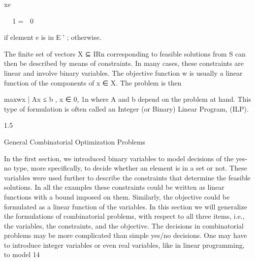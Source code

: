 \documentclass[titlepage]{book}
\begin{document}
xe


 1
=
 0

if element e is in E ′ ;
otherwise.

The finite set of vectors X ⊆ IRn corresponding to feasible solutions from S can then be described by
means of constraints. In many cases, these constraints are linear and involve binary variables. The
objective function w is usually a linear function of the components of x ∈ X. The problem is then

max{wx | Ax ≤ b , x ∈ {0, 1}n }
where A and b depend on the problem at hand. This type of formulation is often called an Integer (or
Binary) Linear Program, (ILP).

1.5

General Combinatorial Optimization Problems

In the first section, we introduced binary variables to model decisions of the yes-no type, more specifically,
to decide whether an element is in a set or not. These variables were used further to describe the
constraints that determine the feasible solutions. In all the examples these constraints could be written
as linear functions with a bound imposed on them. Similarly, the objective could be formulated as a linear
function of the variables. In this section we will generalize the formulations of combinatorial problems,
with respect to all three items, i.e., the variables, the constraints, and the objective.
The decisions in combinatorial problems may be more complicated than simple yes/no decisions. One
may have to introduce integer variables or even real variables, like in linear programming, to model
14
\end{document}
